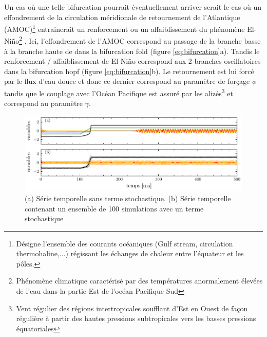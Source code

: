 Un cas où une telle bifurcation pourrait éventuellement arriver serait le cas où un effondrement de la circulation méridionale de retournement de l'Atlantique (AMOC)\footnote{Désigne l'ensemble des courants océaniques (Gulf stream, circulation thermohaline,...) régissant les échanges de chaleur entre l'équateur et les pôles.} entrainerait un renforcement ou un affaiblissement du phénomène El-Niño\footnote{Phénomène climatique caractérisé par des températures anormalement élevées de l'eau dans la partie Est de l'océan Pacifique-Sud} \cite{timmermann_influence_2007}. Ici, l'effondrement de l'AMOC correspond au passage de la branche basse à la branche haute de dans la bifurcation fold (figure \ref{eq:bifurcation}a). Tandis le renforcement / affaiblissement de El-Niño correspond aux 2 branches oscillatoires dans la bifurcation hopf (figure \ref{eq:bifurcation}b). Le retournement est lui forcé par le flux d'eau douce et donc ce dernier correspond au paramètre de forçage $\phi$ tandis que le couplage avec l'Océan Pacifique est assuré par les alizés\footnote{Vent régulier des régions intertropicales soufflant d'Est en Ouest de façon régulière à partir des hautes pressions subtropicales vers les basses pressions équatoriales} et correspond au paramètre $\gamma$.


\begin{figure}[htbp]
  \centering
  \includegraphics{figures/time-series.pdf}
  \caption{(a) Série temporelle sans terme stochastique. (b) Série temporelle contenant un ensemble de 100 simulations avec un terme stochastique}
  \label{fig:time-series}
\end{figure}



